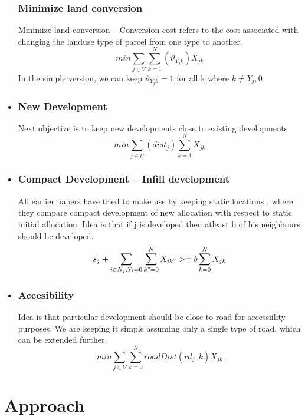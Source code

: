 \documentclass[12pt]{article} %
\begin{document}
\begin{itemize}
\subsubsection*{Minimize land conversion }
Minimize land conversion -- Conversion cost refers to the cost associated with changing the landuse type of parcel from one type to another.
$$
 min\sum_{j \in V}  \sum_{k=1}^N (\vartheta_{Y_{j}k}) X_{jk}
 $$
In the simple version, we can keep $\vartheta_{Y_{j}k} =  1$ for all k where $k \neq Y_{j},0$
\item
\subsubsection*{ New Development}
Next objective is to keep new developments close to existing developments
 $$
 min\sum_{j \in U}(dist_j) \sum_{k=1}^N X_{jk}
 $$


\item
\subsubsection*{Compact Development -- Infill development}
All earlier papers have tried to make use by keeping static locations , where they compare compact development of new allocation with respect to static initial allocation.
Idea is that if j is developed then atleast b of his neighbours should be developed.
$$
s_j +\sum_{i \in N_j, Y_{i} =0 } \sum_{k"=0}^N X_{ik"} >= b \sum_{k=0}^N X_{jk}
 $$
\item
\subsubsection*{Accesibility  }
Idea is that particular development should be close to road for accessiility purposes. We are keeping it simple assuming only a single type of road, which can be extended further.
 $$
 min\sum_{j \in V} \sum_{k=0}^N roadDist(rd_j,k)X_{jk}
 $$



\end{itemize}

\section{Approach}
\end{document}

